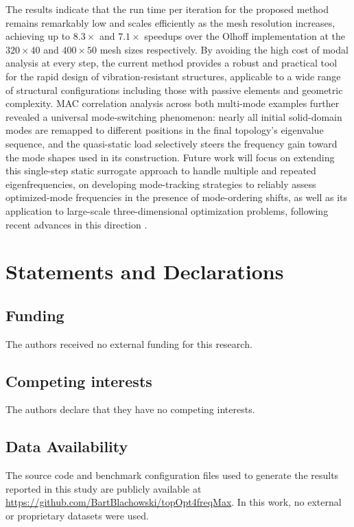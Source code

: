 \documentclass[pdflatex,lineno,sn-mathphys-ay]{sn-jnl}
\begin{document}
The results indicate that the run time per iteration for the proposed method remains remarkably low and scales efficiently as the mesh resolution increases, achieving up to $8.3\times$ and $7.1\times$ speedups over the Olhoff implementation at the $320{\times}40$ and $400{\times}50$ mesh sizes respectively. By avoiding the high cost of modal analysis at every step, the current method provides a robust and practical tool for the rapid design of vibration-resistant structures, applicable to a wide range of structural configurations including those with passive elements and geometric complexity. MAC correlation analysis across both multi-mode examples further revealed a universal mode-switching phenomenon: nearly all initial solid-domain modes are remapped to different positions in the final topology's eigenvalue sequence, and the quasi-static load selectively steers the frequency gain toward the mode shapes used in its construction. Future work will focus on extending this single-step static surrogate approach to handle multiple and repeated eigenfrequencies, on developing mode-tracking strategies to reliably assess optimized-mode frequencies in the presence of mode-ordering shifts, as well as its application to large-scale three-dimensional optimization problems, following recent advances in this direction \citep{Huang2025, Deng2024}.

\section*{Statements and Declarations}
\subsection*{Funding}
The authors received no external funding for this research.

\subsection*{Competing interests}
The authors declare that they have no competing interests.

\subsection*{Data Availability}
The source code and benchmark configuration files used to generate the results reported in this study are publicly available at \href{https://github.com/BartBlachowski/topOpt4freqMax}{https://github.com/BartBlachowski/topOpt4freqMax}. In this work, no external or proprietary datasets were used.
\end{document}
